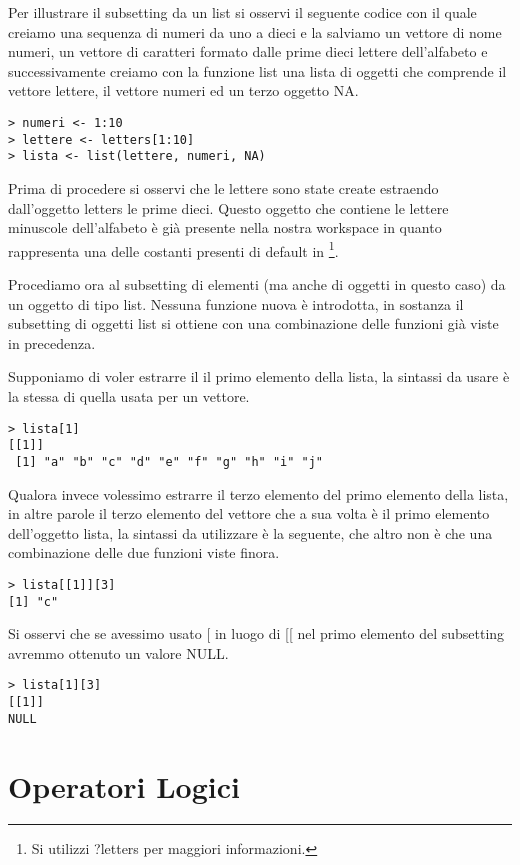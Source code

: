 Per illustrare il subsetting da un list si osservi il seguente codice con il quale creiamo una sequenza di numeri da uno a dieci e la salviamo un vettore di nome \textsf{numeri}, un vettore di caratteri formato dalle prime dieci lettere dell'alfabeto e successivamente creiamo con la funzione \textsf{list} una lista di oggetti che comprende il vettore lettere, il vettore numeri ed un terzo oggetto NA.

\begin{lstlisting}
> numeri <- 1:10
> lettere <- letters[1:10]
> lista <- list(lettere, numeri, NA)
\end{lstlisting}

Prima di procedere si osservi che le lettere sono state create estraendo dall'oggetto \textsf{letters} le prime dieci. Questo oggetto che contiene le lettere minuscole dell'alfabeto è già presente nella nostra workspace in quanto rappresenta una delle costanti presenti di default in \erre\footnote{Si utilizzi ?letters per maggiori informazioni.}.

Procediamo ora al subsetting di elementi (ma anche di oggetti in questo caso) da un oggetto di tipo list. Nessuna funzione nuova è introdotta, in sostanza il subsetting di oggetti list si ottiene con una combinazione delle funzioni già viste in precedenza.

Supponiamo di voler estrarre il il primo elemento della lista, la sintassi da usare è la stessa di quella usata per un vettore.
\begin{lstlisting}
> lista[1]
[[1]]
 [1] "a" "b" "c" "d" "e" "f" "g" "h" "i" "j"
\end{lstlisting}
 
Qualora invece volessimo estrarre il terzo elemento del primo elemento della lista, in altre parole il terzo elemento del vettore che a sua volta è il primo elemento dell'oggetto lista, la sintassi da utilizzare è la seguente, che altro non è che una combinazione delle due funzioni viste finora.
\begin{lstlisting}
> lista[[1]][3]
[1] "c"
\end{lstlisting}

Si osservi che se avessimo usato \textsf{[} in luogo di \textsf{[[} nel primo elemento del subsetting avremmo ottenuto un valore NULL.
\begin{lstlisting}
> lista[1][3]
[[1]]
NULL
\end{lstlisting}
\section{Operatori Logici}

